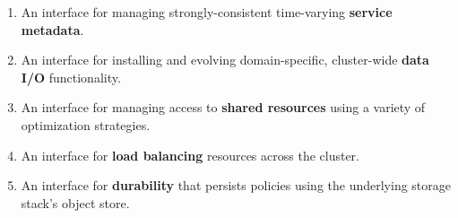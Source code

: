 \begin{enumerate}

\item An interface for managing strongly-consistent time-varying
\textbf{service metadata}.

\item An interface for installing and evolving domain-specific, cluster-wide
\textbf{data I/O} functionality.

\item An interface for managing access to \textbf{shared resources} using a
variety of optimization strategies.

\item An interface for \textbf{load balancing} resources across the cluster.

\item An interface for \textbf{durability} that persists policies using the
underlying storage stack's object store.

\end{enumerate}

